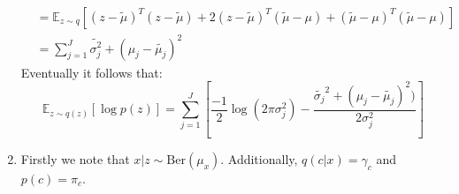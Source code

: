 \documentclass{article}
\begin{document}
\begin{enumerate}
\begin{align*}
    &= \mathbb{E}_{z \sim q} \left[ (z - \tilde{\mu})^T (z - \tilde{\mu}) + 2(z - \tilde{\mu})^T (\tilde{\mu} - \mu) + (\tilde{\mu} - \mu)^T (\tilde{\mu} - \mu) \right] \\
    &= \sum_{j=1}^J \tilde{\sigma_j^2} + (\mu_j - \tilde{\mu_j})^2
    \end{align*}
    Eventually it follows that:
    \begin{equation*}
        \mathbb{E}_{z \sim q(z)} [\log p(z)] = 
        \sum_{j=1}^J [ \frac{-1}{2} \log(2\pi \sigma_j^2) - 
        \frac{\tilde{\sigma_j}^2 + (\mu_j - \tilde{\mu_j})^2)}{2\sigma_j^2}
        ]
    \end{equation*}
    \item Firstly we note that $x|z \sim \mathrm{Ber}(\mu_x)$. Additionally, $q(c|x) = \gamma_c$ and $p(c) = \pi_c$.


\end{enumerate}
\end{document}
